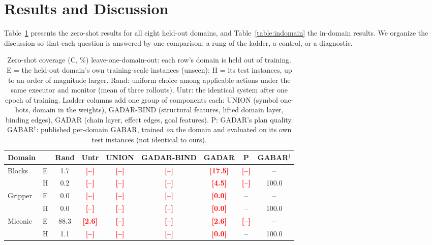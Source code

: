 \documentclass[letterpaper]{article} %
\newcommand{\gadar}{GADAR}                 %
\newcommand{\gadarbind}{\gadar{}-BIND}     %
\newcommand{\union}{UNION}                 %
\newcommand{\todonum}[1]{\textcolor{red}{\textbf{[#1]}}}
\begin{document}
\section{Results and Discussion}

Table~\ref{table:main_table} presents the zero-shot results for all eight
held-out domains, and Table~\ref{table:indomain} the in-domain results. We
organize the discussion so that each question is answered by one
comparison: a rung of the ladder, a control, or a diagnostic.

\begin{table}[t]
\setlength{\tabcolsep}{2.2pt}
\renewcommand{\arraystretch}{1.05}
\footnotesize
\centering
\caption{Zero-shot coverage (C, \%) leave-one-domain-out: each row's domain
is held out of training. E = the held-out domain's own training-scale
instances (unseen); H = its test instances, up to an order of magnitude
larger. Rand: uniform choice among applicable actions under the same
executor and monitor (mean of three rollouts). Untr: the identical system
after one epoch of training. Ladder columns add one group of components
each: \union{} (symbol one-hots, domain in the weights), \gadarbind{}
(structural features, lifted domain layer, binding edges), \gadar{} (chain
layer, effect edges, goal features). P: \gadar{}'s plan quality.
GABAR$^\dagger$: published per-domain GABAR, trained \emph{on} the domain
and evaluated on its own test instances (not identical to ours).}
\label{table:main_table}
\begin{tabular}{@{}ll|cc|ccc|c|c@{}}
\toprule
Domain & & Rand & Untr & \union{} & \gadarbind{} & \textbf{\gadar{}} & P & GABAR$^\dagger$ \\
\midrule
\multirow{2}{*}{Blocks}    & E & 1.7  & \todonum{--} & \todonum{--} & \todonum{--} & \todonum{17.5} & \todonum{--} & -- \\
                           & H & 0.2  & \todonum{--} & \todonum{--} & \todonum{--} & \todonum{4.5}  & \todonum{--} & 100.0 \\
\midrule
\multirow{2}{*}{Gripper}   & E & 0.0  & \todonum{--} & \todonum{--} & \todonum{--} & \todonum{0.0}  & -- & -- \\
                           & H & 0.0  & \todonum{--} & \todonum{--} & \todonum{--} & \todonum{0.0}  & -- & 100.0 \\
\midrule
\multirow{2}{*}{Miconic}   & E & 88.3 & \todonum{2.6} & \todonum{--} & \todonum{--} & \todonum{2.6} & \todonum{--} & -- \\
                           & H & 1.1  & \todonum{--} & \todonum{--} & \todonum{--} & \todonum{0.0}  & -- & 100.0 \\

\end{tabular}
\end{table}
\end{document}
